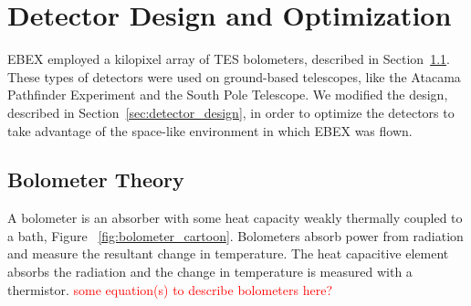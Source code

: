 \chapter{Detector Design and Optimization}
\label{sec:optimization_chapter}

\ac{EBEX} employed a kilopixel array of \ac{TES} bolometers, described in Section~\ref{sec:tes_bolometer}. 
These types of detectors were used on ground-based telescopes, like the Atacama Pathfinder Experiment and the South Pole Telescope. 
We modified the design, described in Section~\ref{sec:detector_design}, in order to optimize the detectors to take advantage of the space-like environment in which \ac{EBEX} was flown.


\section{Bolometer Theory}
\label{sec:tes_bolometer}




A bolometer is an absorber with some heat capacity weakly thermally coupled to a bath, Figure ~\ref{fig:bolometer_cartoon}. 
Bolometers absorb power from radiation and measure the resultant change in temperature. 
The heat capacitive element absorbs the radiation and the change in temperature is measured with a thermistor. 
\textcolor{red}{some equation(s) to describe bolometers here?}

